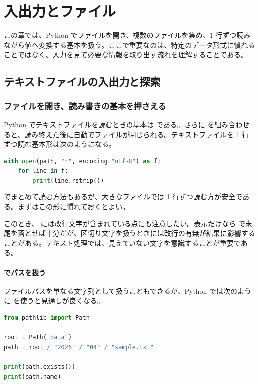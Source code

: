 \chapter{入出力とファイル}

この章では、Python でファイルを開き、複数のファイルを集め、1 行ずつ読みながら値へ変換する基本を扱う。ここで重要なのは、特定のデータ形式に慣れることではなく、入力を見て必要な情報を取り出す流れを理解することである。

\section{テキストファイルの入出力と探索}

\subsection{ファイルを開き、読み書きの基本を押さえる}

Python でテキストファイルを読むときの基本は  である。さらに  を組み合わせると、読み終えた後に自動でファイルが閉じられる。テキストファイルを 1 行ずつ読む基本形は次のようになる。

\begin{lstlisting}[language=Python]
with open(path, "r", encoding="utf-8") as f:
    for line in f:
        print(line.rstrip())
\end{lstlisting}

 でまとめて読む方法もあるが、大きなファイルでは 1 行ずつ読む方が安全である。まずはこの形に慣れておくとよい。

このとき、 には改行文字が含まれている点にも注意したい。表示だけなら  で末尾を落とせば十分だが、区切り文字を扱うときには改行の有無が結果に影響することがある。テキスト処理では、見えていない文字を意識することが重要である。

\subsubsection{ でパスを扱う}

ファイルパスを単なる文字列として扱うこともできるが、Python では次のように  を使うと見通しが良くなる。

\begin{lstlisting}[language=Python]
from pathlib import Path

root = Path("data")
path = root / "2026" / "04" / "sample.txt"

print(path.exists())
print(path.name)
\end{lstlisting}

